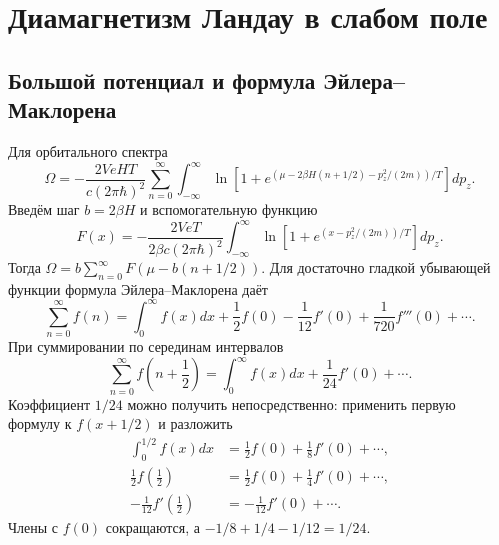 \documentclass[../final.tex]{subfiles}
\begin{document}
\section{Диамагнетизм Ландау в слабом поле}
\subsection{Большой потенциал и формула Эйлера--Маклорена}
Для орбитального спектра
\begin{equation*}
 \Omega=-\frac{2VeHT}{c(2\pi\hbar)^2}
 \sum_{n=0}^\infty\int_{-\infty}^{\infty}
 \ln\left[1+e^{(\mu-2\beta H(n+1/2)-p_z^2/(2m))/T}\right]dp_z.
\end{equation*}
Введём шаг $b=2\beta H$ и вспомогательную функцию
\begin{equation*}
 F(x)=-\frac{2VeT}{2\beta c(2\pi\hbar)^2}
 \int_{-\infty}^{\infty}\ln\left[1+e^{(x-p_z^2/(2m))/T}\right]dp_z.
\end{equation*}
Тогда $\Omega=b\sum_{n=0}^\infty F(\mu-b(n+1/2))$.
Для достаточно гладкой убывающей функции формула Эйлера--Маклорена даёт
\begin{equation*}
 \sum_{n=0}^\infty f(n)
 =\int_0^\infty f(x)dx+\frac12f(0)-\frac1{12}f'(0)
 +\frac1{720}f'''(0)+\cdots.
\end{equation*}
При суммировании по серединам интервалов
\begin{equation*}
 \sum_{n=0}^\infty f\left(n+\frac12\right)
 =\int_0^\infty f(x)dx+\frac1{24}f'(0)+\cdots.
\end{equation*}
Коэффициент $1/24$ можно получить непосредственно: применить первую формулу
к $f(x+1/2)$ и разложить
\begin{align*}
 \int_0^{1/2}f(x)dx&=\frac12f(0)+\frac18f'(0)+\cdots,\\
 \frac12f\left(\frac12\right)&=\frac12f(0)+\frac14f'(0)+\cdots,\\
 -\frac1{12}f'\left(\frac12\right)&=-\frac1{12}f'(0)+\cdots.
\end{align*}
Члены с $f(0)$ сокращаются, а $-1/8+1/4-1/12=1/24$.

\end{document}
